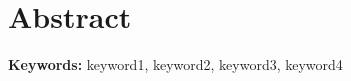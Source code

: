 
\chapter*{Abstract}

\lipsum[1]

\vspace{0.5cm}
\noindent\textbf{Keywords:} keyword1, keyword2, keyword3, keyword4
